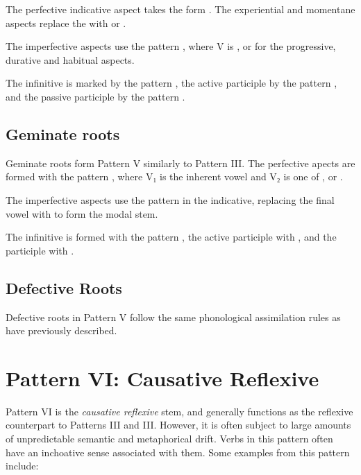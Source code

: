 \documentclass[grammar]{subfiles}
\begin{document}
The perfective indicative aspect takes the form . The
experiential and momentane aspects replace the  with  or .

The imperfective aspects use the pattern , where V is
,  or  for the progressive, durative and habitual aspects.

The infinitive is marked by the pattern , the active participle
by the pattern , and the passive participle by the pattern
.


\subsection{Geminate roots}
\label{ssec:vm:v_geminate_roots}

Geminate roots form Pattern V similarly to Pattern III.   The perfective apects are formed with the pattern
, where V₁ is the inherent vowel and V₂ is one of ,
 or .

The imperfective aspects use the pattern  in the indicative,
replacing the final vowel with  to form the modal stem. 

The infinitive is formed with the pattern , the active participle
with , and the participle with .  


\subsection{Defective Roots}
\label{ssec:vm:v_defective_roots}

Defective roots in Pattern V follow the same phonological assimilation rules
as have previously described. 


\clearpage
\section{Pattern VI: Causative Reflexive}
\label{sec:vm:pattern_vi}

Pattern VI is the \emph{causative reflexive} stem, and generally functions as
the reflexive counterpart to Patterns III and III.  However, it is often subject
to large amounts of unpredictable semantic and metaphorical drift.  Verbs in
this pattern often have an inchoative sense associated with them. Some examples
from this pattern include: 
\end{document}
